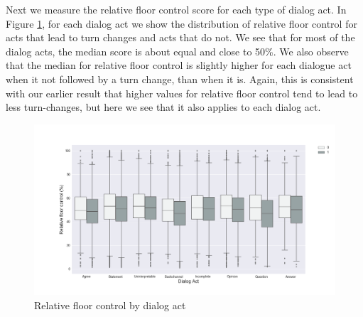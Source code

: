 Next we measure the relative floor control score for each type of dialog act.
In Figure \ref{fig:act:turn:rfc}, for each dialog act we show the distribution of relative floor control for acts that lead to turn changes and acts that do not. We see that for most of the dialog acts, the median score is about equal and close to 50\%.
%
We also observe that the median for relative floor control is slightly higher for each dialogue act when it not followed by a turn change, than when it is.  Again, this is consistent with our earlier result that higher values for relative floor control tend to lead to less turn-changes, but here we see that it also applies to each dialog act.
%
\begin{figure}[ht!]
\centering
\includegraphics[width=\textwidth]{../scikitlearn/figures/f4.png}\vspace{-1em}
\caption{Relative floor control by dialog act}
\label{fig:act:turn:rfc}
\end{figure}

